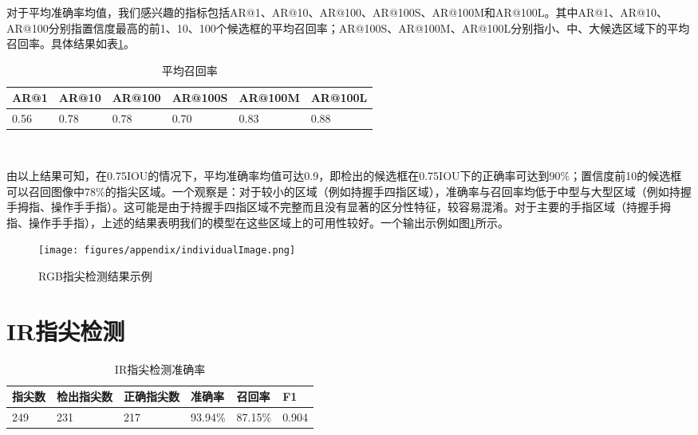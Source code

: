 对于平均准确率均值，我们感兴趣的指标包括AR@1、AR@10、AR@100、AR@100S、AR@100M和AR@100L。其中AR@1、AR@10、AR@100分别指置信度最高的前1、10、100个候选框的平均召回率；AR@100S、AR@100M、AR@100L分别指小、中、大候选区域下的平均召回率。具体结果如表\ref{tbl:fingertip_recall}。

\begin{table}[htbp]
\centering
\caption{平均召回率}
\label{tbl:fingertip_recall}
\begin{tabular}{p{60 pt}p{60 pt}p{60 pt}p{60 pt}p{60 pt}p{60 pt}}
 \toprule
  AR@1 & AR@10 & AR@100 & AR@100S & AR@100M & AR@100L\\
 \midrule
    0.56 & 0.78 & 0.78 & 0.70 & 0.83 & 0.88 \\
\bottomrule
 \end{tabular}\\[2pt]
\end{table}

由以上结果可知，在0.75IOU的情况下，平均准确率均值可达0.9，即检出的候选框在0.75IOU下的正确率可达到90\%；置信度前10的候选框可以召回图像中78\%的指尖区域。一个观察是：对于较小的区域（例如持握手四指区域），准确率与召回率均低于中型与大型区域（例如持握手拇指、操作手手指）。这可能是由于持握手四指区域不完整而且没有显著的区分性特征，较容易混淆。对于主要的手指区域（持握手拇指、操作手手指），上述的结果表明我们的模型在这些区域上的可用性较好。一个输出示例如图\ref{fig:rgb_example}所示。

\begin{figure}[h]
  \centering
  \texttt{[image: figures/appendix/individualImage.png]}
  \caption{RGB指尖检测结果示例}
  \label{fig:rgb_example}
\end{figure}

\section{IR指尖检测}

\begin{table}[htbp]
\centering
\caption{IR指尖检测准确率}
\label{tbl:fingertip_ir_result}
\begin{tabular}{p{60 pt}p{60 pt}p{60 pt}p{60 pt}p{60 pt}p{60 pt}}
 \toprule
   指尖数 & 检出指尖数 & 正确指尖数 & 准确率 & 召回率 & F1 \\
 \midrule
    249 & 231 & 217 & 93.94\% & 87.15\% & 0.904 \\
\bottomrule
 \end{tabular}\\[2pt]
\end{table}

